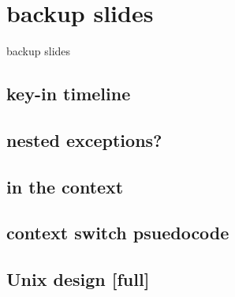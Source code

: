 \date{}
\title{}
\date{}

\begin{frame}
    \titlepage
\end{frame}





\section{backup slides}
\begin{frame}{backup slides}
\end{frame}

\subsection{key-in timeline}


\subsection{nested exceptions?}


\subsection{in the context}


\subsection{context switch psuedocode}


\subsection{Unix design [full]}


